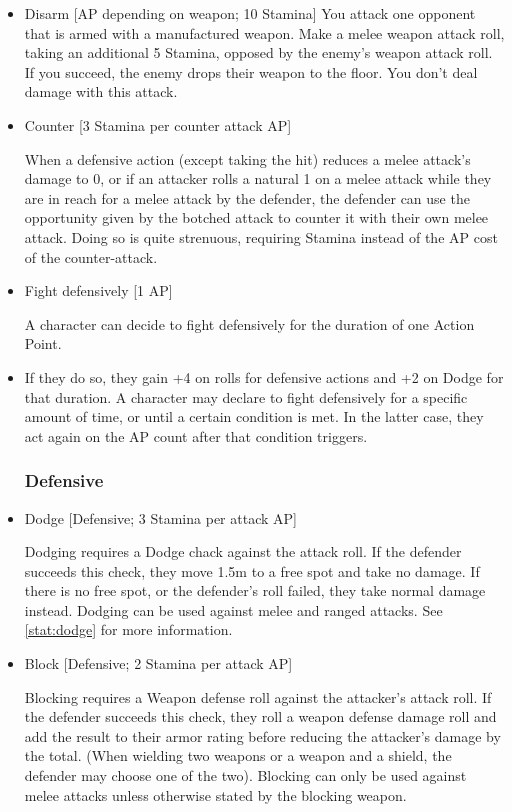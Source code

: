 \begin{itemize}
\item Disarm [AP depending on weapon; 10 Stamina]
You attack one opponent that is armed with a manufactured weapon.
Make a melee weapon attack roll, taking an additional 5 Stamina, opposed by the enemy's weapon attack roll.
If you succeed, the enemy drops their weapon to the floor.
You don't deal damage with this attack.\\


\item Counter [3 Stamina per counter attack AP]

When a defensive action (except taking the hit) reduces a melee attack's damage to 0, or if an attacker rolls a natural 1 on a melee attack while they are in reach for a melee attack by the defender, the defender can use the opportunity given by the botched attack to counter it with their own melee attack.
Doing so is quite strenuous, requiring Stamina instead of the AP cost of the counter-attack.


\item Fight defensively [1 AP]

A character can decide to fight defensively for the duration of one Action Point.

\item If they do so, they gain +4 on rolls for defensive actions and +2 on Dodge for that duration.
A character may declare to fight defensively for a specific amount of time, or until a certain condition is met.
In the latter case, they act again on the AP count after that condition triggers.

\subsubsection{Defensive}\label{subsubsec:defensiveStaticCombatActions}


\item Dodge [Defensive; 3 Stamina per attack AP]

Dodging requires a Dodge chack against the attack roll.
If the defender succeeds this check, they move 1.5m to a free spot and take no damage.
If there is no free spot, or the defender's roll failed, they take normal damage instead.
Dodging can be used against melee and ranged attacks.
See \ref{stat:dodge} for more information.

\item Block [Defensive; 2 Stamina per attack AP]

Blocking requires a Weapon defense roll against the attacker's attack roll.
If the defender succeeds this check, they roll a weapon defense damage roll and add the result to their armor rating before reducing the attacker's damage by the total.
(When wielding two weapons or a weapon and a shield, the defender may choose one of the two).
Blocking can only be used against melee attacks unless otherwise stated by the blocking weapon.


\end{itemize}
